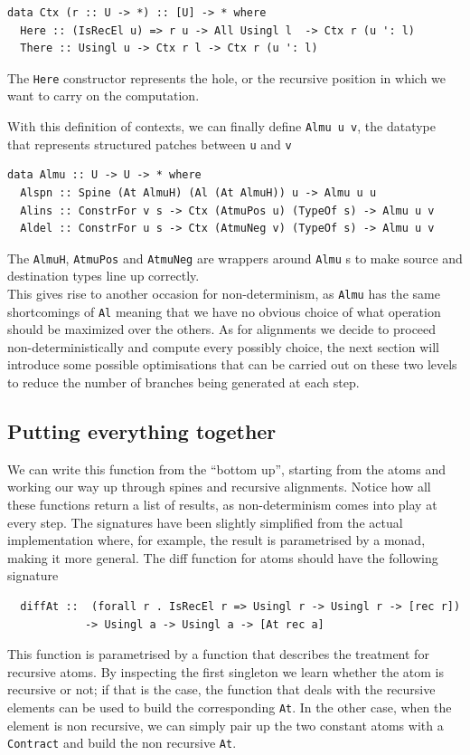 \documentclass[11pt, titlepage]{article}
\newcommand{\toHaskell}[1]{\texttt{#1}\xspace}
\begin{document}
\begin{verbatim}
data Ctx (r :: U -> *) :: [U] -> * where
  Here :: (IsRecEl u) => r u -> All Usingl l  -> Ctx r (u ': l)
  There :: Usingl u -> Ctx r l -> Ctx r (u ': l)
\end{verbatim}

The \toHaskell{Here} constructor represents the hole, or the recursive position in which we want to carry on the computation. 

With this definition of contexts, we can finally define \toHaskell{Almu u v}, the datatype that represents structured patches between \toHaskell{u} and \toHaskell{v}

\begin{verbatim}
data Almu :: U -> U -> * where
  Alspn :: Spine (At AlmuH) (Al (At AlmuH)) u -> Almu u u
  Alins :: ConstrFor v s -> Ctx (AtmuPos u) (TypeOf s) -> Almu u v
  Aldel :: ConstrFor u s -> Ctx (AtmuNeg v) (TypeOf s) -> Almu u v
\end{verbatim}

The \toHaskell{AlmuH}, \toHaskell{AtmuPos} and \toHaskell{AtmuNeg} are wrappers around \toHaskell{Almu}s to make source and destination types line up correctly.
\\
This gives rise to another occasion for non-determinism, as \texttt{Almu} has 
the same shortcomings of \texttt{Al} meaning that we have no obvious choice of 
what operation should be maximized over the others. As for alignments we decide to proceed non-deterministically
and compute every possibly choice, the next section will introduce some possible optimisations 
that can be carried out on these two levels to reduce the number of branches 
being generated at each step.

\subsection{Putting everything together}\label{putting everything together}

We can write this function from the ``bottom up'',
starting from the atoms and working our way up through spines and recursive alignments. 
Notice how all these functions return a list of results, as non-determinism 
comes into play at every step. The signatures have been slightly simplified from 
the actual implementation where, for example, the result is 
parametrised by a monad, making it more general.
The diff function for atoms should have the following signature
\begin{verbatim}
  diffAt ::  (forall r . IsRecEl r => Usingl r -> Usingl r -> [rec r])
            -> Usingl a -> Usingl a -> [At rec a]
\end{verbatim}
This function is parametrised by a function that describes the treatment for 
recursive atoms. By inspecting the first singleton we learn whether the atom is 
recursive or not; if that is the case, the function that deals with the 
recursive elements can be used to build the corresponding \texttt{At}. In the 
other case, when the element is non recursive, we can simply pair up the two 
constant atoms with a \texttt{Contract} and build the non recursive \texttt{At}.
\end{document}
